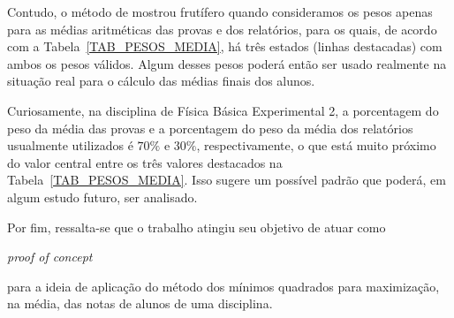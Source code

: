 \documentclass[11pt]{article}
\begin{document}
                Contudo, o método de mostrou frutífero
                quando consideramos os pesos apenas para as
                médias aritméticas das provas e dos
                relatórios, para os quais, de acordo com a
                Tabela~\ref{TAB_PESOS_MEDIA}, há três
                estados (linhas destacadas) com ambos os
                pesos válidos. Algum desses pesos poderá então
                ser usado realmente na situação real para
                o cálculo das médias finais dos alunos.

                Curiosamente, na disciplina de Física
                Básica Experimental 2, a porcentagem do peso
                da média das provas e a porcentagem do peso da
                média dos relatórios usualmente utilizados é
                $70\%$ e $30\%$, respectivamente, o que está
                muito próximo do valor central entre os três
                valores destacados na
                Tabela~\ref{TAB_PESOS_MEDIA}. Isso sugere
                um possível padrão que poderá, em algum
                estudo futuro, ser analisado.

                Por fim, ressalta-se que o trabalho atingiu seu
                objetivo de atuar como
                \begin{otherlanguage}{english}
                        \textit{proof of concept}
                \end{otherlanguage}
                para a ideia de aplicação do método dos
                mínimos quadrados para maximização, na média,
                das notas de alunos de uma disciplina.
        \printbibliography
\end{document}
